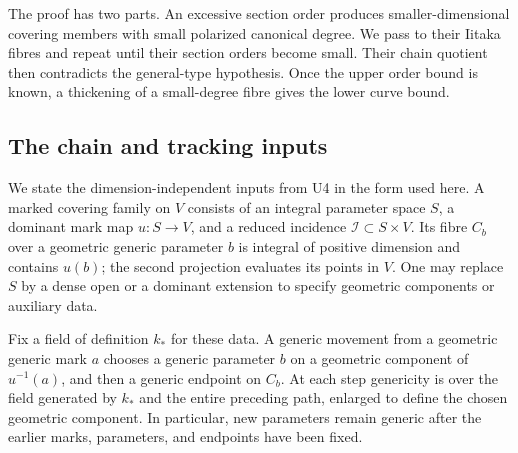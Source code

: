 The proof has two parts.  An excessive section order produces
smaller-dimensional covering members with small polarized canonical
degree.  We pass to their Iitaka fibres and repeat until their section
orders become small.  Their chain quotient then contradicts the
general-type hypothesis.  Once the upper order bound is known, a
thickening of a small-degree fibre gives the lower curve bound.

\subsection{The chain and tracking inputs}

We state the dimension-independent inputs from U4 in the form used
here.  A marked covering family on $V$ consists of an integral
parameter space $S$, a dominant mark map $u:S\to V$, and a reduced
incidence $\mathcal I\subset S\times V$.  Its fibre $C_b$ over a
geometric generic parameter $b$ is integral of positive dimension
and contains $u(b)$; the second projection evaluates its points in
$V$.  One may replace $S$ by a dense open or a dominant extension
to specify geometric components or auxiliary data.

Fix a field of definition $k_*$ for these data.  A generic movement
from a geometric generic mark $a$ chooses a generic parameter $b$
on a geometric component of $u^{-1}(a)$, and then a generic endpoint
on $C_b$.  At each step genericity is over the field generated by
$k_*$ and the entire preceding path, enlarged to define the chosen
geometric component.  In particular, new parameters remain generic
after the earlier marks, parameters, and endpoints have been fixed.

